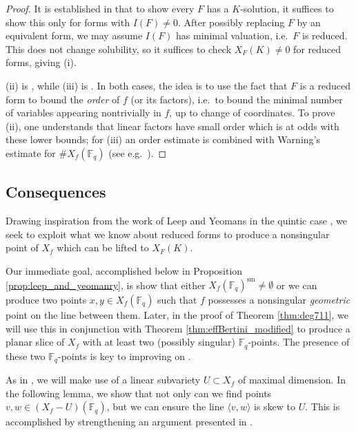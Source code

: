 \documentclass{amsart}
\newcommand{\F}{\mathbb{F}}
\newcommand{\Span}[1]{\langle #1 \rangle}
\newcommand{\sm}{\mathrm{sm}}
\theoremstyle{definition}
\numberwithin{equation}{section}
\numberwithin{table}{section}
\begin{document}
\begin{proof}
    It is established in \cite[Corollary]{LaxtonLewis1965} that to show every $F$ has a $K$-solution, it suffices to show this only for forms with $I(F) \neq 0$. After possibly replacing $F$ by an equivalent form, we may assume $I(F)$ has minimal valuation, i.e.\ $F$ is reduced. This does not change solubility, so it suffices to check $X_F(K) \neq 0$ for reduced forms, giving (i).

    (ii) is \cite[Lemma 9]{LaxtonLewis1965}, while (iii) is \cite[Corollary 4.4]{LeepYeomans1996_quintic_forms}. In both cases, the idea is to use the fact that $F$ is a reduced form to bound the \textit{order} of $f$ (or its factors), i.e.\ to bound the minimal number of variables appearing nontrivially in $f$, up to change of coordinates. To prove (ii), one understands that linear factors have small order which is at odds with these lower bounds; for (iii) an order estimate is combined with Warning's estimate for $\#X_f(\F_q)$ (see e.g.\ \cite[Lemma 3.1]{LeepYeomans1996_quintic_forms}).
\end{proof}

\subsection{Consequences}
\label{subsec:consequences}

Drawing inspiration from the work of Leep and Yeomans in the quintic case \cite{LeepYeomans1996_quintic_forms}, we seek to exploit what we know about reduced forms to produce a nonsingular point of $X_f$ which can be lifted to $X_F(K)$.

Our immediate goal, accomplished below in Proposition \ref{prop:leep_and_yeomanry}, is show that either $X_f(\F_q)^\sm \neq \emptyset$ or we can produce two points $x,y \in X_f(\F_q)$ such that $f$ possesses a nonsingular \textit{geometric} point on the line between them. Later, in the proof of Theorem \ref{thm:deg711}, we will use this in conjunction with Theorem \ref{thm:effBertini_modified} to produce a planar slice of $X_f$ with at least two (possibly singular) $\F_q$-points. The presence of these two $\F_q$-points is key to improving on \cite[Theorem 1]{Wooley2008_7ic_11ic}.

As in \cite{LeepYeomans1996_quintic_forms}, we will make use of a linear subvariety $U \subset X_f$ of maximal dimension. In the following lemma, we show that not only can we find points $v,w \in (X_f - U)(\F_q)$, but we can ensure the line $\Span{v,w}$ is skew to $U$. This is accomplished by strengthening an argument presented in \cite[Proof of Prop.\ 5.4]{LeepYeomans1996_quintic_forms}.
\end{document}
